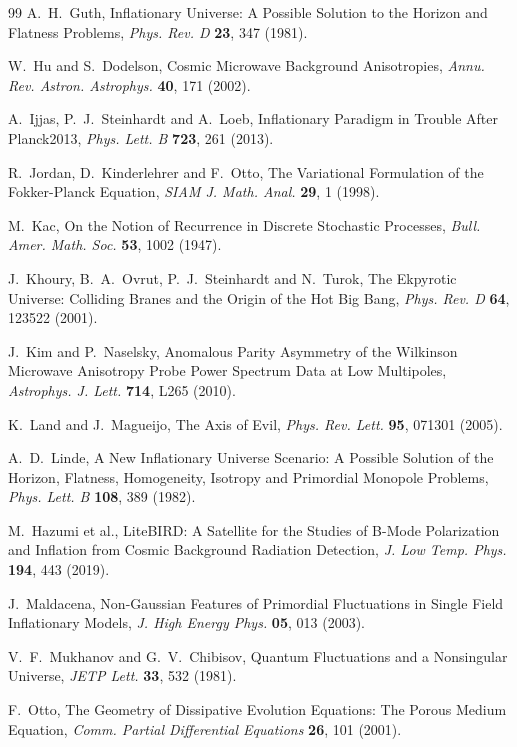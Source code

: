 \documentclass[11pt]{article}
\theoremstyle{definition}
\theoremstyle{remark}
\begin{document}
\begin{thebibliography}{99}
 A.~H.~Guth, Inflationary Universe: A Possible Solution to the Horizon and Flatness Problems, \emph{Phys. Rev. D} \textbf{23}, 347 (1981).

 W.~Hu and S.~Dodelson, Cosmic Microwave Background Anisotropies, \emph{Annu. Rev. Astron. Astrophys.} \textbf{40}, 171 (2002).

 A.~Ijjas, P.~J.~Steinhardt and A.~Loeb, Inflationary Paradigm in Trouble After Planck2013, \emph{Phys. Lett. B} \textbf{723}, 261 (2013).

 R.~Jordan, D.~Kinderlehrer and F.~Otto, The Variational Formulation of the Fokker-Planck Equation, \emph{SIAM J. Math. Anal.} \textbf{29}, 1 (1998).

 M.~Kac, On the Notion of Recurrence in Discrete Stochastic Processes, \emph{Bull. Amer. Math. Soc.} \textbf{53}, 1002 (1947).

 J.~Khoury, B.~A.~Ovrut, P.~J.~Steinhardt and N.~Turok, The Ekpyrotic Universe: Colliding Branes and the Origin of the Hot Big Bang, \emph{Phys. Rev. D} \textbf{64}, 123522 (2001).

 J.~Kim and P.~Naselsky, Anomalous Parity Asymmetry of the Wilkinson Microwave Anisotropy Probe Power Spectrum Data at Low Multipoles, \emph{Astrophys. J. Lett.} \textbf{714}, L265 (2010).

 K.~Land and J.~Magueijo, The Axis of Evil, \emph{Phys. Rev. Lett.} \textbf{95}, 071301 (2005).

 A.~D.~Linde, A New Inflationary Universe Scenario: A Possible Solution of the Horizon, Flatness, Homogeneity, Isotropy and Primordial Monopole Problems, \emph{Phys. Lett. B} \textbf{108}, 389 (1982).

 M.~Hazumi et al., LiteBIRD: A Satellite for the Studies of B-Mode Polarization and Inflation from Cosmic Background Radiation Detection, \emph{J. Low Temp. Phys.} \textbf{194}, 443 (2019).

 J.~Maldacena, Non-Gaussian Features of Primordial Fluctuations in Single Field Inflationary Models, \emph{J. High Energy Phys.} \textbf{05}, 013 (2003).

 V.~F.~Mukhanov and G.~V.~Chibisov, Quantum Fluctuations and a Nonsingular Universe, \emph{JETP Lett.} \textbf{33}, 532 (1981).

 F.~Otto, The Geometry of Dissipative Evolution Equations: The Porous Medium Equation, \emph{Comm. Partial Differential Equations} \textbf{26}, 101 (2001).


\end{thebibliography}
\end{document}
